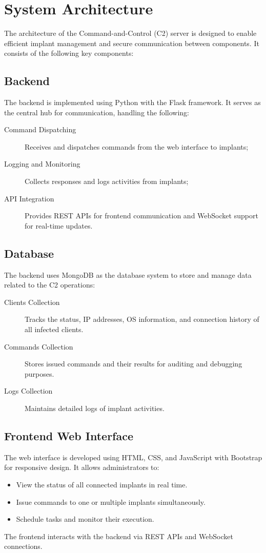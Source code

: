 \chapter{System Architecture}
The architecture of the Command-and-Control (C2) server is designed to enable efficient implant management and secure communication between components. It consists of the following key components:

\section{Backend}
The backend is implemented using Python with the Flask framework. It serves as the central hub for communication, handling the following:
\begin{description}
    \item[Command Dispatching] Receives and dispatches commands from the web interface to implants;
    \item[Logging and Monitoring] Collects responses and logs activities from implants;
    \item[API Integration] Provides REST APIs for frontend communication and WebSocket support for real-time updates. 
\end{description}


\section{Database}
The backend uses MongoDB as the database system to store and manage data related to the C2 operations:

\begin{description}
    \item[Clients Collection] Tracks the status, IP addresses, OS information, and connection history of all infected clients.
    \item[Commands Collection] Stores issued commands and their results for auditing and debugging purposes.
    \item[Logs Collection] Maintains detailed logs of implant activities.    
\end{description}

\section{Frontend Web Interface}
The web interface is developed using HTML, CSS, and JavaScript with Bootstrap for responsive design. It allows administrators to:
\begin{itemize}
    \item View the status of all connected implants in real time.
    \item Issue commands to one or multiple implants simultaneously.
    \item Schedule tasks and monitor their execution.
\end{itemize}
The frontend interacts with the backend via REST APIs and WebSocket connections.

